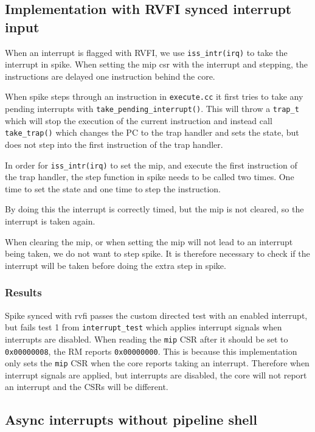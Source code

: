 \subsection{Implementation with RVFI synced interrupt input}

When an interrupt is flagged with RVFI, we use \lstinline{iss_intr(irq)} to take the interrupt in spike. When setting the mip csr with the interrupt and stepping, the instructions are delayed one instruction behind the core.

When spike steps through an instruction in \lstinline{execute.cc} it first tries to take any pending interrupts with \lstinline{take_pending_interrupt()}. This will throw a \lstinline{trap_t} which will stop the execution of the current instruction and instead call \lstinline{take_trap()} which changes the PC to the trap handler and sets the state, but does not step into the first instruction of the trap handler. 

In order for \lstinline{iss_intr(irq)} to set the mip, and execute the first instruction of the trap handler, the step function in spike needs to be called two times. One time to set the state and one time to step the instruction.

By doing this the interrupt is correctly timed, but the mip is not cleared, so the interrupt is taken again.

When clearing the mip, or when setting the mip will not lead to an interrupt being taken, we do not want to step spike. It is therefore necessary to check if the interrupt will be taken before doing the extra step in spike.

\subsubsection{Results}

Spike synced with rvfi passes the custom directed test with an enabled interrupt, but fails test 1 from \lstinline{interrupt_test} which applies interrupt signals when interrupts are disabled. When reading the \lstinline{mip} CSR after it should be set to \lstinline{0x00000008}, the RM reports \lstinline{0x00000000}. This is because this implementation only sets the \lstinline{mip} CSR when the core reports taking an interrupt. Therefore when interrupt signals are applied, but interrupts are disabled, the core will not report an interrupt and the CSRs will be different.


\subsection{Async interrupts without pipeline shell }


